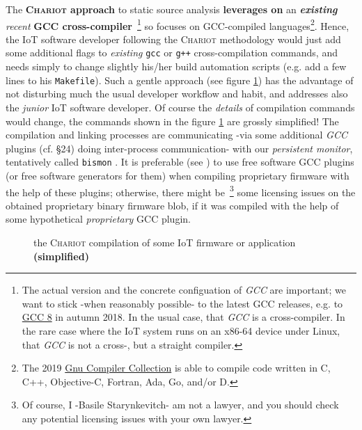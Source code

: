 \medskip

The \textbf{\textsc{Chariot} approach} to static source analysis
\textbf{leverages on} an \textbf{\emph{existing}} \emph{recent}
\textbf{GCC cross-compiler}~\footnote{The actual version and the
  concrete configuation of \emph{GCC} are important; we want to stick
  -when reasonably possible- to the latest GCC releases, e.g. to
  \href{https://gcc.gnu.org/gcc-8/}{GCC 8} in autumn 2018. In the
  usual case, that \emph{GCC} is a cross-compiler. In the rare case
  where the IoT system runs on an x86-64 device under Linux, that
  \emph{GCC} is not a cross-, but a straight compiler.} so focuses on
GCC-compiled languages\footnote{The 2019
  \href{https://gcc.gnu.org/}{Gnu Compiler Collection} is able to
  compile code written in C, C++, Objective-C, Fortran, Ada, Go,
  and/or D.}. Hence, the IoT software developer following the
\textsc{Chariot} methodology would just add some additional flags to
\emph{existing} \texttt{gcc} or \texttt{g++} cross-compilation
commands, and needs simply to change slightly his/her build automation
scripts (e.g. add a few lines to his \texttt{Makefile}). Such a gentle
approach (see figure \ref{fig:chariotcompil}) has the advantage of not
disturbing much the usual developer workflow and habit, and addresses
also the \emph{junior} IoT software developer. Of course the \emph
{details} of compilation commands would change, the commands shown in
the figure \ref{fig:chariotcompil} are grossly simplified! The
compilation and linking processes are communicating -via some
additional \emph{GCC} plugins (cf. \cite{gcc-internals} \S24) doing
inter-process communication- with our 
 \emph{persistent monitor}, tentatively
called \texttt{bismon} . It is preferable (see
\cite{gcc-runtime-library-exception}) to use free software GCC plugins
(or free software generators for them) when compiling proprietary
firmware with the help of these plugins; otherwise, there might
be~\footnote{Of course, I -Basile Starynkevitch- am not a lawyer, and
  you should check any potential licensing issues with your own
  lawyer.} some licensing issues on the obtained proprietary binary
firmware blob, if it was compiled with the help of some hypothetical
\emph{proprietary} GCC plugin.

\begin{figure}[h]
  \begin{center}
  \end{center}
  \caption{the \textsc{Chariot} compilation of some IoT firmware or
    application {\textbf{(simplified)}}}
  \label{fig:chariotcompil}
\end{figure}

